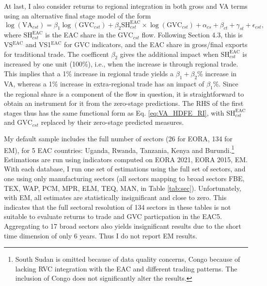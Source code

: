 \documentclass[a4paper]{article}
\begin{document}
At last, I also consider returns to regional integration in both gross and VA terms using an alternative final stage model of the form
\begin{equation} \label{eq:VA_HDFE_RI}
\log(\text{VA}_{cst}) = \beta_1 \log(\text{GVC}_{cst}) + \beta_2 \text{SH}_{cst}^\text{EAC} \times \log(\text{GVC}_{cst}) + \alpha_{cs} + \beta_{ct} +\gamma_{st} + \epsilon_{cst},
\end{equation}
where $\text{SH}_{cst}^\text{EAC}$ is the EAC share in the $\text{GVC}_{cst}$ flow. Following Section 4.3, this is VS$^\text{EAC}$ and VS1$^\text{EAC}$ for GVC indicators, and the EAC share in gross/final exports for traditional trade. The coefficent $\beta_2$ gives the additional impact when $\text{SH}_{cst}^\text{EAC}$ is increased by one unit (100\%), i.e., when the increase is through regional trade. This implies that a 1\% increase in regional trade yields a $\beta_1+\beta_2$\% increase in VA, whereas a 1\% increase in extra-regional trade has an impact of $\beta_1$\%. Since the regional share is a component of the flow in question, it is straightforward to obtain an instrument for it from the zero-stage predictions. The RHS of the first stages thus has the same functional form as Eq. \ref{eq:VA_HDFE_RI}, with $\text{SH}_{cst}^\text{EAC}$ and $\text{GVC}_{cst}$ replaced by their zero-stage predicted measures. \newline


My default sample includes the full number of sectors (26 for EORA, 134 for EM), for 5 EAC countries: Uganda, Rwanda, Tanzania, Kenya and Burundi.\footnote{South Sudan is omitted because of data quality concerns, Congo because of lacking RVC integration with the EAC and different trading patterns. The inclusion of Congo does not significantly alter the results. \vspace{-5mm}} %
Estimations are run using indicators computed on EORA 2021, EORA 2015, EM. With each database, I run one set of estimations using the full set of sectors, and one using only manufacturing sectors (all sectors mapping to broad sectors FBE, TEX, WAP, PCM, MPR, ELM, TEQ, MAN, in Table \ref{tab:sec}). Unfortunately, with EM, all estimates are statistically insignificant and close to zero. This indicates that the full sectoral resolution of 134 sectors in these tables is not suitable to evaluate returns to trade and GVC particpation in the EAC5. Aggregating to 17 broad sectors also yields insignificant results due to the short time dimension of only 6 years. Thus I do not report EM results. %
\end{document}
